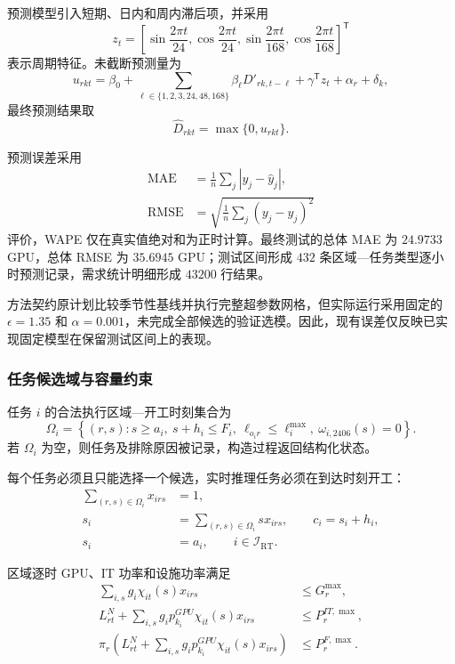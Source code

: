 预测模型引入短期、日内和周内滞后项，并采用
\begin{equation}
z_t=\left[
\sin\frac{2\pi t}{24},
\cos\frac{2\pi t}{24},
\sin\frac{2\pi t}{168},
\cos\frac{2\pi t}{168}
\right]^{\mathsf T}
\end{equation}
表示周期特征。未截断预测量为
\begin{equation}
u_{rkt}=\beta_0+
\sum_{\ell\in\{1,2,3,24,48,168\}}\beta_\ell D'_{rk,t-\ell}
+\gamma^{\mathsf T}z_t+\alpha_r+\delta_k,
\end{equation}
最终预测结果取
\begin{equation}
\widehat D_{rkt}=\max\{0,u_{rkt}\}.
\end{equation}

预测误差采用
\begin{align}
\mathrm{MAE}&=\frac{1}{n}\sum_j|y_j-\widehat y_j|,\\
\mathrm{RMSE}&=\sqrt{\frac{1}{n}\sum_j(y_j-\widehat y_j)^2}
\end{align}
评价，WAPE 仅在真实值绝对和为正时计算。最终测试的总体 MAE 为 $24.9733$ GPU，总体 RMSE 为 $35.6945$ GPU；测试区间形成 $432$ 条区域—任务类型逐小时预测记录，需求统计明细形成 $43200$ 行结果。

方法契约原计划比较季节性基线并执行完整超参数网格，但实际运行采用固定的 $\epsilon=1.35$ 和 $\alpha=0.001$，未完成全部候选的验证选模。因此，现有误差仅反映已实现固定模型在保留测试区间上的表现。

\subsubsection{任务候选域与容量约束}

任务 $i$ 的合法执行区域—开工时刻集合为
\begin{equation}
\Omega_i=\left\{(r,s):s\ge a_i,\ s+h_i\le F_i,\
\ell_{o_ir}\le\ell_i^{\max},\ \omega_{i,2406}(s)=0\right\}.
\end{equation}
若 $\Omega_i$ 为空，则任务及排除原因被记录，构造过程返回结构化状态。

每个任务必须且只能选择一个候选，实时推理任务必须在到达时刻开工：
\begin{align}
\sum_{(r,s)\in\Omega_i}x_{irs}&=1,\\
s_i&=\sum_{(r,s)\in\Omega_i}sx_{irs},\qquad c_i=s_i+h_i,\\
s_i&=a_i,\qquad i\in\mathcal I_{\mathrm{RT}}.
\end{align}

区域逐时 GPU、IT 功率和设施功率满足
\begin{align}
\sum_{i,s}g_i\chi_{it}(s)x_{irs}&\le G_r^{\max},\\
L_{rt}^{N}+\sum_{i,s}g_ip_{k_i}^{GPU}\chi_{it}(s)x_{irs}
&\le P_r^{IT,\max},\\
\pi_r\left(L_{rt}^{N}+\sum_{i,s}g_ip_{k_i}^{GPU}
\chi_{it}(s)x_{irs}\right)&\le P_r^{F,\max}.
\end{align}


